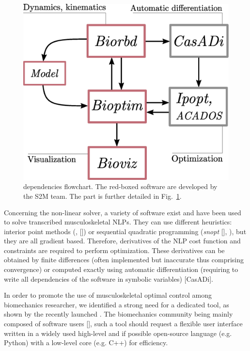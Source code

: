 \begin{figure}[t!]
\centering
\includegraphics[width=0.9\columnwidth]{figures/dependencies.eps}
\caption{\bioptim dependencies flowchart. The red-boxed software are developed by the S2M team. The \bioptim part is further detailed in Fig.~\ref{fig:dependencies}.}
\label{fig:dependencies}
\vspace*{-0.5cm}
\end{figure}

Concerning the non-linear solver, a variety of software exist and have been used to solve transcribed musculoskeletal NLPs.
They can use different heuristics: interior point methods (\ipopt, [\addref]) or sequential quadratic programming (\textit{snopt} [\addref], \acados [\addref]), but they are all gradient based.
Therefore, derivatives of the NLP cost function and constraints are required to perform optimization.
These derivatives can be obtained by finite differences (often implemented but inaccurate thus comprising convergence) or computed exactly using automatic differentiation (requiring to write all dependencies of the software in symbolic variables) [CasADi].


In order to promote the use of musculoskeletal optimal control among biomechanics researcher, we identified a strong need for a dedicated tool, as shown by the recently launched . 
The biomechanics community being mainly composed of software users [\addref], such a tool should request a flexible user interface written in a widely used high-level and if possible open-source language (e.g. Python) with a low-level core (e.g. C++) for efficiency. 

